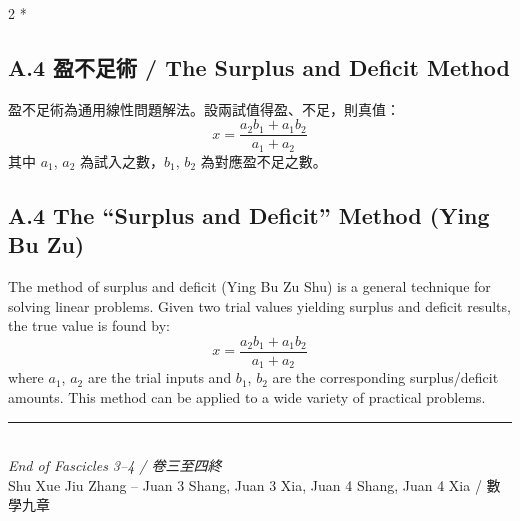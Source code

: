 \documentclass[11pt,a4paper]{article}
\begin{document}
\begin{paracol}{2}
\switchcolumn[0]*

\begin{leftcolumn*}
\subsection*{A.4 盈不足術 / The Surplus and Deficit Method}

盈不足術為通用線性問題解法。設兩試值得盈、不足，則真值：
\[
x = \frac{a_2b_1 + a_1b_2}{a_1 + a_2}
\]
其中 $a_1$, $a_2$ 為試入之數，$b_1$, $b_2$ 為對應盈不足之數。
\end{leftcolumn*}

\begin{rightcolumn}
\subsection*{A.4 The ``Surplus and Deficit'' Method (Ying Bu Zu)}

The method of surplus and deficit (Ying Bu Zu Shu) is a general technique for 
solving linear problems. Given two trial values yielding surplus and deficit 
results, the true value is found by:
\[
x = \frac{a_2b_1 + a_1b_2}{a_1 + a_2}
\]
where $a_1$, $a_2$ are the trial inputs and $b_1$, $b_2$ are the 
corresponding surplus/deficit amounts. This method can be applied to 
a wide variety of practical problems.
\end{rightcolumn}

\end{paracol}

\vspace{1cm}

\begin{center}
{\color{rulecolor}\rule{10cm}{0.4pt}}\\[0.5cm]
{\small\textit{End of Fascicles 3--4 / 卷三至四終}}\\[0.3cm]
{\small Shu Xue Jiu Zhang -- Juan 3 Shang, Juan 3 Xia, Juan 4 Shang, Juan 4 Xia / 數學九章}
\end{center}
\end{document}
